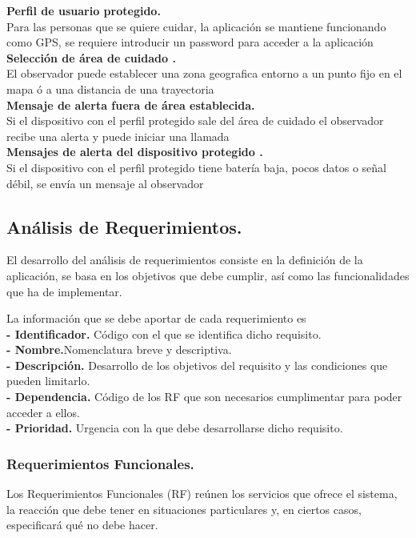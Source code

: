 \documentclass[10pt]{article}
\begin{document}
\textbf{ Perfil de usuario protegido.}  \\

Para las personas que se quiere cuidar, la aplicación se mantiene funcionando como GPS, se requiere introducir un password para acceder a la aplicación \\

\textbf{ Selección de área de cuidado .}  \\

El observador puede establecer una zona geografica entorno a un punto fijo en el mapa ó a una distancia de una trayectoria \\

\textbf{ Mensaje de alerta fuera de área establecida.}  \\

Si el dispositivo con el perfil protegido sale del área de cuidado el observador recibe una alerta y puede iniciar una llamada \\

\textbf{ Mensajes de alerta del dispositivo protegido .}  \\

Si el dispositivo con el perfil protegido tiene batería baja, pocos datos o señal débil, se envía un mensaje al observador
\newpage 
\subsection{Análisis de Requerimientos.}
El desarrollo del análisis de requerimientos consiste en la definición de la aplicación, se basa en los objetivos que debe cumplir, así como las funcionalidades que ha de implementar.

La información que se debe aportar de cada requerimiento es\\
\textbf{- Identificador.} Código con el que se identifica dicho requisito.\\
\textbf{- Nombre.}Nomenclatura breve y descriptiva.\\
\textbf{- Descripción.} Desarrollo de los objetivos del requisito y las condiciones que pueden limitarlo.\\
\textbf{- Dependencia.} Código de los RF que son necesarios cumplimentar para poder 
acceder a ellos.\\
\textbf{- Prioridad.} Urgencia con la que debe desarrollarse dicho requisito.\\

\subsubsection{Requerimientos Funcionales.}
Los Requerimientos Funcionales (RF) reúnen los servicios que ofrece el sistema, la reacción que debe tener en situaciones particulares y, en ciertos casos, especificará qué no debe hacer.\\
\end{document}
